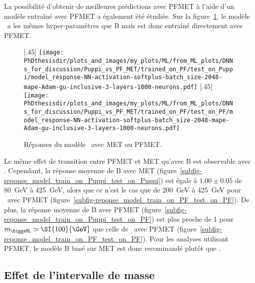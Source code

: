 \par
La possibilité d'obtenir de meilleures prédictions avec PFMET à l'aide d'un modèle entraîné avec PFMET a également été étudiée.
Sur la figure~\ref{fig-MET-PF-PUPPI-Bpf},
le modèle \Bpf\ a les mêmes hyper-paramètres que B mais est donc entraîné directement avec PFMET.
\begin{figure}[h]
\centering

[.45\textwidth]
{\texttt{[image: \\PhDthesisdir/plots\_and\_images/my\_plots/ML/from\_ML\_plots/DNNs\_for\_discussion/Puppi\_vs\_PF\_MET/trained\_on\_PF/test\_on\_Puppi/model\_response-NN-activation-softplus-batch\_size-2048-mape-Adam-gu-inclusive-3-layers-1000-neurons.pdf]}\vspace{-.5\baselineskip}}
\hfill
{}[.45\textwidth]
{\texttt{[image: \\PhDthesisdir/plots\_and\_images/my\_plots/ML/from\_ML\_plots/DNNs\_for\_discussion/Puppi\_vs\_PF\_MET/trained\_on\_PF/test\_on\_PF/model\_response-NN-activation-softplus-batch\_size-2048-mape-Adam-gu-inclusive-3-layers-1000-neurons.pdf]}\vspace{-.5\baselineskip}}

\caption{Réponses du modèle \Bpf\ avec \PUPPI MET ou PFMET.}
\label{fig-MET-PF-PUPPI-Bpf}
\end{figure}
\par
Le même effet de transition entre PFMET et \PUPPI MET qu'avec B est observable avec \Bpf.
Cependant,
la réponse moyenne de B avec \PUPPI MET (figure~\ref{subfig-reponse_model_train_on_Puppi_test_on_Puppi})
est égale à $\num{1.00}\pm\num{0.05}$ de \SI{80}{\GeV} à \SI{425}{\GeV},
alors que ce n'est le cas que de \SI{200}{\GeV} à \SI{425}{\GeV}
pour \Bpf\ avec PFMET (figure~\ref{subfig-reponse_model_train_on_PF_test_on_PF}).
De plus, la réponse moyenne de B avec PFMET (figure~\ref{subfig-reponse_model_train_on_Puppi_test_on_PF})
est plus proche de 1 pour $m_{\higgsML}\simeq\SI{100}{\GeV}$
que celle de \Bpf\ avec PFMET (figure~\ref{subfig-reponse_model_train_on_PF_test_on_PF}).
Pour les analyses utilisant PFMET,
le modèle B basé sur \PUPPI MET est donc recommandé plutôt que \Bpf.
\subsection{Effet de l'intervalle de masse}
